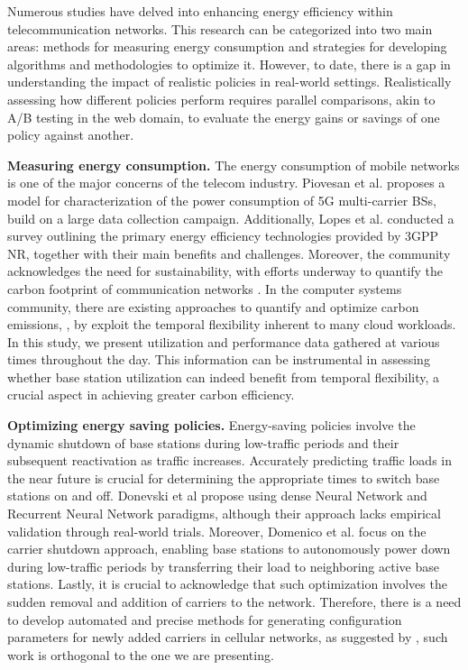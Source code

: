 Numerous studies have delved into enhancing energy efficiency within telecommunication networks. This research can be categorized into two main areas: methods for measuring energy consumption and strategies for developing algorithms and methodologies to optimize it. However, to date, there is a gap in understanding the impact of realistic policies in real-world settings. Realistically assessing how different policies perform requires parallel comparisons, akin to A/B testing in the web domain, to evaluate the energy gains or savings of one policy against another.


\textbf{Measuring energy consumption.} The energy consumption of mobile networks is one of the major concerns of the telecom industry. Piovesan et al. \cite{Piovesan2022} proposes a model for characterization of the power consumption of 5G multi-carrier BSs, build on a large data collection campaign. Additionally, Lopes et al. \cite{survey_5g_energy_efficiency} conducted a survey outlining the primary energy efficiency technologies provided by 3GPP NR, together with their main benefits and challenges. Moreover, the community acknowledges the need for sustainability, with efforts underway to quantify the carbon footprint of communication networks \cite{IEA2024}. In the computer systems community, there are existing approaches to quantify and optimize carbon emissions, \cite{CarbonScaler}, by exploit the temporal flexibility inherent to many cloud workloads. In this study, we present utilization and performance data gathered at various times throughout the day. This information can be instrumental in assessing whether base station utilization can indeed benefit from temporal flexibility, a crucial aspect in achieving greater carbon efficiency.

\textbf{Optimizing energy saving policies.} Energy-saving policies involve the dynamic shutdown of base stations during low-traffic periods and their subsequent reactivation as traffic increases. Accurately predicting traffic loads in the near future is crucial for determining the appropriate times to switch base stations on and off. Donevski et al \cite{Donevski2019} propose using dense Neural Network and Recurrent Neural Network paradigms, although their approach lacks empirical validation through real-world trials. Moreover, Domenico et al. \cite{user_transfer_5g} focus on the carrier shutdown approach, enabling base stations to autonomously power down during low-traffic periods by transferring their load to neighboring active base stations. Lastly, it is crucial to acknowledge that such optimization involves the sudden removal and addition of carriers to the network. Therefore, there is a need to develop automated and precise methods for generating configuration parameters for newly added carriers in cellular networks, as suggested by 
\cite{auric}, such work is orthogonal to the one we are presenting.